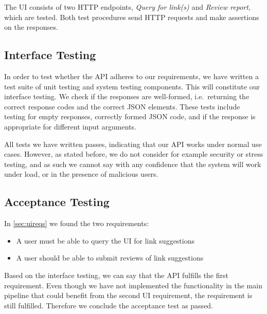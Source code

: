 The UI consists of two HTTP endpoints, \emph{Query for link(s)} and \emph{Review report}, which are tested. Both test procedures send HTTP requests and make assertions on the responses.

\subsection{Interface Testing}
In order to test whether the API adheres to our requirements, we have written a test suite of unit testing and system testing components. This will constitute our interface testing. We check if the responses are well-formed, i.e.\ returning the correct response codes and the correct JSON elements. These tests include testing for empty responses, correctly formed JSON code, and if the response is appropriate for different input arguments.

All tests we have written passes, indicating that our API works under normal use cases. However, as stated before, we do not consider for example security or stress testing, and as such we cannot say with any confidence that the system will work under load, or in the presence of malicious users.

\subsection{Acceptance Testing}
In \cref{sec:uireqs} we found the two requirements:
\begin{itemize}
	\item A user must be able to query the UI for link suggestions
	\item A user should be able to submit reviews of link suggestions
\end{itemize}

Based on the interface testing, we can say that the API fulfills the first requirement. Even though we have not implemented the functionality in the main pipeline that could benefit from the second UI requirement, the requirement is still fulfilled. Therefore we conclude the acceptance test as passed.


